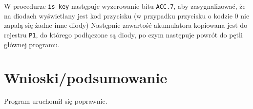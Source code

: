 \documentclass[12pt,a4paper]{article}
\begin{document}
		\begin{minipage}{.5\textwidth}
			
		\end{minipage}%
		\begin{minipage}{.5\textwidth}
			W procedurze \verb|is_key| następuje wyzerowanie bitu \verb|ACC.7|,
			aby zasygnalizować, że na diodach wyświetlany jest kod przycisku (w przypadku przycisku o kodzie 0 nie zapalą się żadne inne diody)
			Następnie zawartość akumulatora kopiowana jest do rejestru \verb|P1|,
			do którego podłączone są diody, po czym następuje powrót do pętli głównej programu.
		\end{minipage}
		
	\section{Wnioski/podsumowanie}
	
			Program uruchomił się poprawnie.
	
\end{document}
